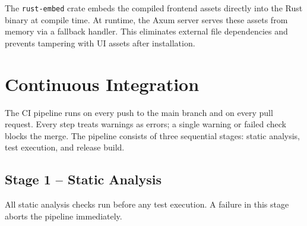 \documentclass[a4paper, 11pt, oneside]{report}
\begin{document}
The \texttt{rust-embed} crate embeds the compiled frontend assets directly
into the Rust binary at compile time.  At runtime, the Axum server serves
these assets from memory via a fallback handler.  This eliminates external
file dependencies and prevents tampering with UI assets after installation.

\section{Continuous Integration}
\label{sec:ci}

The CI pipeline runs on every push to the main branch and on every pull
request.  Every step treats warnings as errors; a single warning or
failed check blocks the merge.  The pipeline consists of three
sequential stages: static analysis, test execution, and release build.

\subsection{Stage 1 -- Static Analysis}
\label{sec:ci-static}

All static analysis checks run before any test execution.  A failure
in this stage aborts the pipeline immediately.
\end{document}
